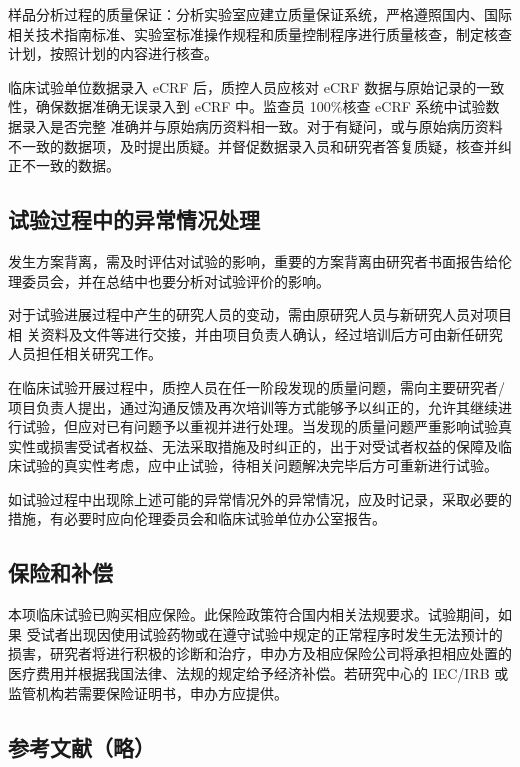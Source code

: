 \documentclass[
  chinese-hans,
  letterpaper,
  DIV=11,
  numbers=noendperiod]{scrreprt}
\begin{document}
样品分析过程的质量保证：分析实验室应建立质量保证系统，严格遵照国内、国际相关技术指南标准、实验室标准操作规程和质量控制程序进行质量核查，制定核查计划，按照计划的内容进行核查。

临床试验单位数据录入 eCRF 后，质控人员应核对 eCRF
数据与原始记录的一致性，确保数据准确无误录入到 eCRF 中。监查员 100\%核查
eCRF 系统中试验数据录入是否完整
准确并与原始病历资料相一致。对于有疑问，或与原始病历资料不一致的数据项，及时提出质疑。并督促数据录入员和研究者答复质疑，核查并纠正不一致的数据。

\subsection{试验过程中的异常情况处理}\label{ux8bd5ux9a8cux8fc7ux7a0bux4e2dux7684ux5f02ux5e38ux60c5ux51b5ux5904ux7406}

发生方案背离，需及时评估对试验的影响，重要的方案背离由研究者书面报告给伦理委员会，并在总结中也要分析对试验评价的影响。

对于试验进展过程中产生的研究人员的变动，需由原研究人员与新研究人员对项目相
关资料及文件等进行交接，并由项目负责人确认，经过培训后方可由新任研究人员担任相关研究工作。

在临床试验开展过程中，质控人员在任一阶段发现的质量问题，需向主要研究者/项目负责人提出，通过沟通反馈及再次培训等方式能够予以纠正的，允许其继续进行试验，但应对已有问题予以重视并进行处理。当发现的质量问题严重影响试验真实性或损害受试者权益、无法采取措施及时纠正的，出于对受试者权益的保障及临床试验的真实性考虑，应中止试验，待相关问题解决完毕后方可重新进行试验。

如试验过程中出现除上述可能的异常情况外的异常情况，应及时记录，采取必要的措施，有必要时应向伦理委员会和临床试验单位办公室报告。

\subsection{保险和补偿}\label{ux4fddux9669ux548cux8865ux507f}

本项临床试验已购买相应保险。此保险政策符合国内相关法规要求。试验期间，如果
受试者出现因使用试验药物或在遵守试验中规定的正常程序时发生无法预计的损害，研究者将进行积极的诊断和治疗，申办方及相应保险公司将承担相应处置的医疗费用并根据我国法律、法规的规定给予经济补偿。若研究中心的
IEC/IRB 或监管机构若需要保险证明书，申办方应提供。

\subsection{参考文献（略）}\label{ux53c2ux8003ux6587ux732eux7565}
\end{document}
